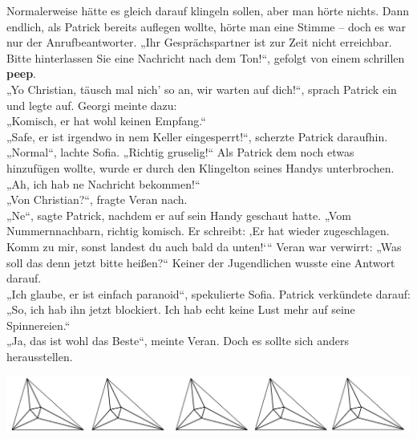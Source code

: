 \documentclass[oneside]{memoir}
\newcommand{\parasep}{
\bigskip
\bigskip
\begin{center} 
   \includegraphics[scale=.08]{parasep5.jpg} 
\end{center}
\bigskip
\bigskip
}
\begin{document}
Normalerweise hätte es gleich darauf klingeln sollen, aber man hörte nichts. Dann endlich, als Patrick bereits auflegen wollte, hörte man eine Stimme -- doch es war nur der 
Anrufbeantworter. „Ihr Gesprächspartner ist zur Zeit nicht erreichbar. Bitte hinterlassen Sie eine Nachricht nach dem Ton!“, gefolgt von einem schrillen \textbf{peep}. \\
„Yo Christian, täusch mal nich' so an, wir warten auf dich!“, sprach Patrick ein und legte auf.
Georgi meinte dazu:  \\ „Komisch, er hat wohl keinen Empfang.“ \\
„Safe, er ist irgendwo in nem Keller eingesperrt!“, scherzte Patrick daraufhin. \\
„Normal“, lachte Sofia. „Richtig gruselig!“
Als Patrick dem noch etwas hinzufügen wollte, wurde er durch den Klingelton seines Handys unterbrochen. \\ „Ah, ich hab ne Nachricht bekommen!“ \\
„Von Christian?“, fragte Veran nach. \\
„Ne“, sagte Patrick, nachdem er auf sein Handy geschaut hatte. „Vom Nummernnachbarn, richtig komisch. Er schreibt: ‚Er hat wieder zugeschlagen. Komm zu mir, sonst landest du auch bald da unten!‘“
Veran war verwirrt: „Was soll das denn jetzt bitte heißen?“
Keiner der Jugendlichen wusste eine Antwort darauf. \\
„Ich glaube, er ist einfach paranoid“, spekulierte Sofia.
Patrick verkündete darauf: „So, ich hab ihn jetzt blockiert. Ich hab echt keine Lust mehr auf seine Spinnereien.“ \\
„Ja, das ist wohl das Beste“, meinte Veran. Doch es sollte sich anders herausstellen.
     
\parasep
\end{document}
